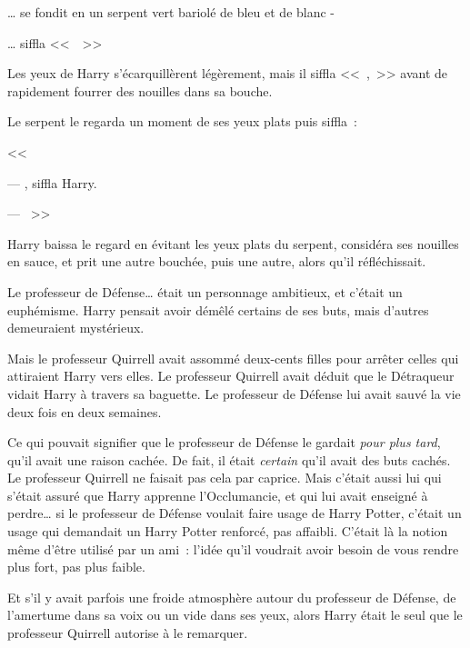 … se fondit en un serpent vert bariolé de bleu et de blanc -

… siffla <<~~>>

Les yeux de Harry s'écarquillèrent légèrement, mais il siffla <<~,~>> avant de rapidement fourrer des nouilles dans sa bouche.

Le serpent le regarda un moment de ses yeux plats puis siffla~:

<<~

--- , siffla Harry.

--- ~>>

Harry baissa le regard en évitant les yeux plats du serpent, considéra ses nouilles en sauce, et prit une autre bouchée, puis une autre, alors qu'il réfléchissait.

Le professeur de Défense… était un personnage ambitieux, et c'était un euphémisme. Harry pensait avoir démêlé certains de ses buts, mais d'autres demeuraient mystérieux.

Mais le professeur Quirrell avait assommé deux-cents filles pour arrêter celles qui attiraient Harry vers elles. Le professeur Quirrell avait déduit que le Détraqueur vidait Harry à travers sa baguette. Le professeur de Défense lui avait sauvé la vie deux fois en deux semaines.

Ce qui pouvait signifier que le professeur de Défense le gardait \emph{pour plus tard}, qu'il avait une raison cachée. De fait, il était \emph{certain} qu'il avait des buts cachés. Le professeur Quirrell ne faisait pas cela par caprice. Mais c'était aussi lui qui s'était assuré que Harry apprenne l'Occlumancie, et qui lui avait enseigné à perdre… si le professeur de Défense voulait faire usage de Harry Potter, c'était un usage qui demandait un Harry Potter renforcé, pas affaibli. C'était là la notion même d'être utilisé par un ami~: l'idée qu'il voudrait avoir besoin de vous rendre plus fort, pas plus faible.

Et s'il y avait parfois une froide atmosphère autour du professeur de Défense, de l'amertume dans sa voix ou un vide dans ses yeux, alors Harry était le seul que le professeur Quirrell autorise à le remarquer.

